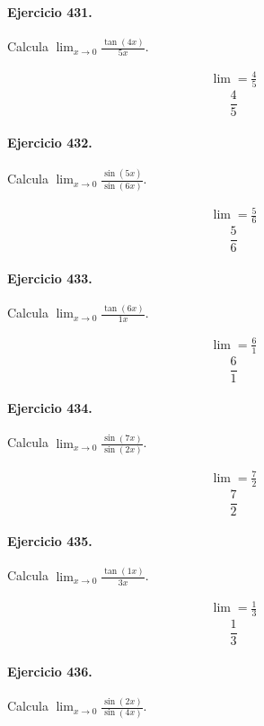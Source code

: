\documentclass[11pt,a4paper]{article}
\begin{document}
\paragraph{Ejercicio 431.} Calcula $\displaystyle\lim_{x\to0}\frac{\tan(4x)}{5x}$.

\[
\begin{aligned}
\lim=\frac{4}{5}
\end{aligned}
\]
\[\boxed{\frac{4}{5}}\]


\paragraph{Ejercicio 432.} Calcula $\displaystyle\lim_{x\to0}\frac{\sin(5x)}{\sin(6x)}$.

\[
\begin{aligned}
\lim=\frac{5}{6}
\end{aligned}
\]
\[\boxed{\frac{5}{6}}\]


\paragraph{Ejercicio 433.} Calcula $\displaystyle\lim_{x\to0}\frac{\tan(6x)}{1x}$.

\[
\begin{aligned}
\lim=\frac{6}{1}
\end{aligned}
\]
\[\boxed{\frac{6}{1}}\]


\paragraph{Ejercicio 434.} Calcula $\displaystyle\lim_{x\to0}\frac{\sin(7x)}{\sin(2x)}$.

\[
\begin{aligned}
\lim=\frac{7}{2}
\end{aligned}
\]
\[\boxed{\frac{7}{2}}\]


\paragraph{Ejercicio 435.} Calcula $\displaystyle\lim_{x\to0}\frac{\tan(1x)}{3x}$.

\[
\begin{aligned}
\lim=\frac{1}{3}
\end{aligned}
\]
\[\boxed{\frac{1}{3}}\]


\paragraph{Ejercicio 436.} Calcula $\displaystyle\lim_{x\to0}\frac{\sin(2x)}{\sin(4x)}$.
\end{document}
